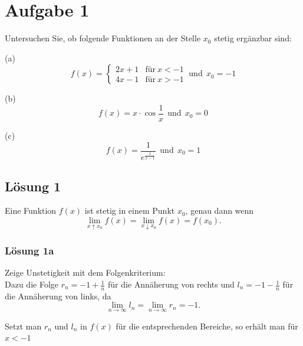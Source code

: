 \documentclass[main.tex]{subfiles}
\begin{document}
\section{Aufgabe 1}
Untersuchen Sie, ob folgende Funktionen an der Stelle $x_{0}$ stetig ergänzbar sind:

(a)
\begin{equation*}
    f(x) =\begin{cases}
        2x+1 & \text{für} \ x < -1\\
        4x-1 & \text{für} \ x > -1
    \end{cases} \ \text{und} \ \ x_{0} = -1
\end{equation*}

(b)
\begin{equation*}
    f(x) =x\cdotp \cos\frac{1}{x} \ \ \text{und} \ \ x_{0} = 0
\end{equation*}

(c)
\begin{equation*}
    f(x) =\frac{1}{e^{\frac{1}{x-1}}} \ \ \text{und} \ \ x_{0} = 1
\end{equation*}

\subsection{Lösung 1}
Eine Funktion $f(x)$ ist stetig in einem Punkt $x_{0}$, genau dann wenn
\begin{equation*}
    \lim_{x \uparrow x_{0}} f(x) = \lim_{x \downarrow x_{0}} f(x) = f(x_{0})\text{.}
\end{equation*}

\subsubsection{Lösung 1a}

Zeige Unstetigkeit mit dem Folgenkriterium:\\

Dazu die Folge $r_{n} =-1+\frac{1}{n}$ für die Annäherung von rechts und $l_{n} =-1-\frac{1}{n}$ für die Annäherung von links, da
\begin{equation*}
    \lim_{n\rightarrow \infty } l_{n} =\lim_{n\rightarrow \infty } r_{n} =-1\text{.}
\end{equation*}

Setzt man $r_{n}$ und $l_{n}$ in $f( x)$ für die entsprechenden Bereiche, so erhält man für $x< -1$
\end{document}
